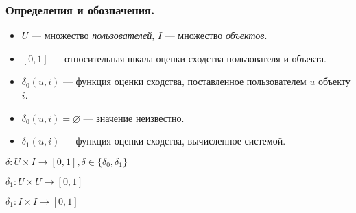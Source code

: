 \documentclass[10pt,xcolor={usenames,dvipsnames}]{beamer}
\theoremstyle{break}
\begin{document}
\begin{frame}
\frametitle{Определения и обозначения.}
\small {
\begin{block}{}
  \begin{itemize}
    \item $U$ --- множество {\it пользователей}, $I$ --- множество {\it объектов}.
    \item $[0,1]$ --- относительная шкала оценки сходства пользователя и объекта.
    \item $\delta_0(u, i)$ --- функция оценки сходства, поставленное пользователем $u$ объекту $i$.
    \item $\delta_0(u, i) = \varnothing$ --- значение неизвестно.
    \item $\delta_1(u, i)$ --- функция оценки сходства, вычисленное системой.
  \end{itemize}

  \begin{center}
    $\delta: U \times I \rightarrow [0,1], \delta \in \{\delta_0, \delta_1\}$ 
  \end{center}

  \begin{center}
    $\delta_1: U \times U \rightarrow [0,1]$ 
  \end{center}

  \begin{center}
    $\delta_1: I \times I \rightarrow [0,1]$ 
  \end{center}
\end{block}
}
\end{frame}
\end{document}

